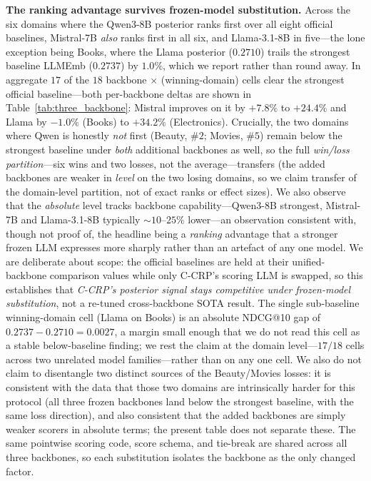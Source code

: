 \textbf{The ranking advantage survives frozen-model substitution.} Across the
six domains where the Qwen3-8B posterior ranks first over all eight official
baselines, Mistral-7B \emph{also} ranks first in all six, and Llama-3.1-8B in
five---the lone exception being Books, where the Llama posterior ($0.2710$) trails
the strongest baseline LLMEmb ($0.2737$) by $1.0\%$, which we report rather than
round away. In aggregate $17$ of the $18$ backbone$\,\times\,$(winning-domain)
cells clear the strongest official baseline---both per-backbone deltas are shown in
Table~\ref{tab:three_backbone}: Mistral improves on it by $+7.8\%$
to $+24.4\%$ and Llama by $-1.0\%$ (Books) to $+34.2\%$ (Electronics). Crucially,
the two domains where Qwen is honestly \emph{not} first (Beauty, $\#2$; Movies,
$\#5$) remain below the strongest baseline under \emph{both} additional backbones
as well, so the full \emph{win/loss partition}---six wins and two losses, not the
average---transfers (the added backbones are weaker in \emph{level} on the two
losing domains, so we claim transfer of the domain-level partition, not of exact
ranks or effect sizes). We also observe that the \emph{absolute} level tracks
backbone capability---Qwen3-8B strongest, Mistral-7B and Llama-3.1-8B typically
$\sim 10\text{--}25\%$ lower---an observation consistent with, though not proof of,
the headline being a \emph{ranking} advantage that a stronger frozen LLM expresses
more sharply rather than an artefact of any one model. We are deliberate about
scope: the official baselines are held at their unified-backbone comparison values
while only C-CRP's scoring LLM is swapped, so this establishes that \emph{C-CRP's
posterior signal stays competitive under frozen-model substitution}, not a
re-tuned cross-backbone SOTA result. The single sub-baseline winning-domain cell
(Llama on Books) is an absolute NDCG@10 gap of $0.2737 - 0.2710 = 0.0027$, a margin
small enough that we do not read this cell as a stable below-baseline finding; we
rest the claim at the domain level---$17/18$ cells across two unrelated model
families---rather than on any one cell. We also do not claim to disentangle two
distinct sources of the Beauty/Movies losses: it is consistent with the data that
those two domains are intrinsically harder for this protocol (all three frozen
backbones land below the strongest baseline, with the same loss direction), and
also consistent that the added backbones are simply weaker scorers in absolute
terms; the present table does not separate these. The same pointwise scoring
code, score schema, and tie-break are shared across all three backbones, so each
substitution isolates the backbone as the only changed factor.

